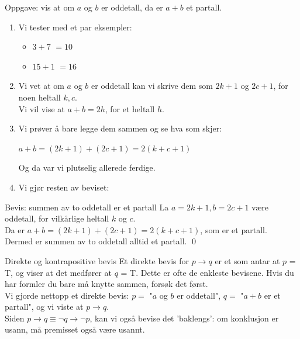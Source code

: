 \begin{frame}{Oppgave: vis at om $a$ og $b$ er oddetall, da er $a + b$ et partall.}
    \pause
    \begin{enumerate}
        \item Vi tester med et par eksempler: 
        \begin{itemize}
            \item $3+7$ \pause $= 10$ \checkmark
            \pause
            \item $15+1$ \pause $ = 16$ \checkmark
        \end{itemize}
        \pause
        \item Vi vet at om $a$ og $b$ er oddetall kan vi skrive dem som $2k + 1$ og $2c + 1$, for noen heltall $k, c$. \\
        \pause
        Vi vil vise at $a + b = 2h$, for et heltall $h$.
        \pause
        \item Vi prøver å bare legge dem sammen og se hva som skjer:
        
        $a + b = (2k + 1) + (2c + 1) = 2(k + c + 1)$

        Og da var vi plutselig allerede ferdige.
        \pause
        \item Vi gjør resten av beviset:
    \end{enumerate}

    \begin{block}{Bevis: summen av to oddetall er et partall}
        La $a = 2k + 1, b = 2c + 1$ være oddetall, for vilkårlige heltall $k$ og $c$.\\
        \pause
        Da er $a + b = (2k + 1) + (2c + 1) = 2(k + c + 1)$, som er et partall.\\
        \pause Dermed er summen av to oddetall alltid et partall. \qed
    \end{block}
\end{frame}

\begin{frame}{Direkte og kontrapositive bevis}
    Et direkte bevis for $p \rightarrow q$ er et som antar at $p$ = T, og viser at det medfører at $q$ = T.
    Dette er ofte de enkleste bevisene. Hvis du har formler du bare må knytte sammen, forsøk det først.\\

    \pause
    Vi gjorde nettopp et direkte bevis: $p =$ "$a$ og $b$ er oddetall", $q =$ "$a+b$ er et partall", og vi viste at $p \rightarrow q$.\\

    \pause
    Siden $p \rightarrow q \equiv \lnot q \rightarrow \lnot p$, kan vi også bevise det 'baklengs': om konklusjon er usann, må premisset også være usannt.
\end{frame}

